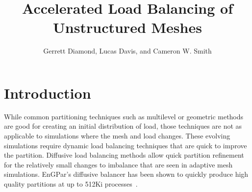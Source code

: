 \documentclass[graybox]{svmult}
\begin{document}
\title*{Accelerated Load Balancing of Unstructured Meshes}
\author{
Gerrett Diamond,
Lucas Davis,
and Cameron W. Smith
}

\maketitle


\section{Introduction} \label{sec:intro}


While common partitioning techniques such as multilevel or geometric methods are
good for creating an initial distribution of load, those techniques are not as
applicable  to simulations where the mesh and load changes.
These evolving simulations require dynamic load balancing techniques that are
quick to improve the partition.
Diffusive load balancing methods allow quick partition refinement for the
relatively small changes to imbalance that are seen in adaptive mesh
simulations.
EnGPar's diffusive balancer has been shown to quickly produce high quality
partitions at up to 512Ki processes~\cite{engparSC17}.
\end{document}
